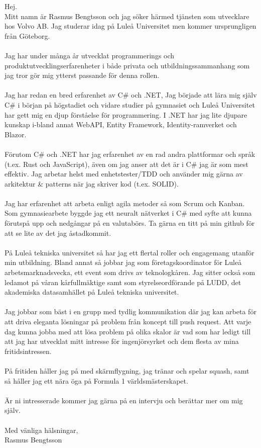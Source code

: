 \documentclass[a4paper]{article}
\newcommand{\company}{Volvo AB}
\newcommand{\position}{utvecklare }
\begin{document}
\vspace{10px}{}
\noindent\large{
Hej. \\

\noindent
Mitt namn är Rasmus Bengtsson och jag söker härmed tjänsten som \position hos \company. Jag studerar idag på Luleå Universitet men kommer ursprungligen från Göteborg. \\
\\
Jag har under många år utvecklat programmerings och produktutvecklingserfarenheter i både privata och utbildningssammanhang som jag tror gör mig ytterst passande för denna rollen. \\
\\
Jag har redan en bred erfarenhet av C\# och .NET, Jag började att lära mig själv C\# i början på högstadiet och vidare studier på gymnasiet och Luleå Universitet har gett mig en djup förståelse för programmering. I .NET har jag lite djupare kunskap i-bland annat WebAPI, Entity Framework, Identity-ramverket och Blazor. \\
\\
Förutom C\# och .NET har jag erfarenhet av en rad andra plattformar och språk (t.ex. Rust och JavaScript), även om jag anser att det är i C\# jag är som mest effektiv. Jag arbetar helst med enhetstester/TDD och använder mig gärna av arkitektur \& patterns när jag skriver kod (t.ex. SOLID). \\
\\
Jag har erfarenhet att arbeta enligt agila metoder så som Scrum och Kanban. Som gymnasiearbete byggde jag ett neuralt nätverket i C\# med syfte att kunna förutspå upp och nedgångar på en valutabörs. Ta gärna en titt på min github för att se lite av det jag åstadkommit. \\
\\
På Luleå tekniska universitet så har jag ett flertal roller och engagemang utanför min utbildning. Bland annat så jobbar jag som företagskoordinator för Luleå arbetsmarknadsvecka, ett event som drivs av teknologkåren. Jag sitter också som ledamot på våran kårfullmäktige samt som styrelseordförande på LUDD, det akademiska datasamhället på Luleå tekniska universitet. \\
\\
Jag jobbar som bäst i en grupp med tydlig kommunikation där jag kan arbeta för att driva eleganta lösningar på problem från koncept till push request. Att varje dag kunna jobba med att lösa problem på olika skalor är vad som har ledigt till att jag har utvecklat mitt intresse för ingenjörsyrket och dem flesta av mina fritidsintressen.\\
\\
På fritiden håller jag på med skärmflygning, jag tränar och spelar squash, samt så håller jag ett nära öga på Formula 1 världsmästerskapet.\\
\\              
Är ni intresserade kommer jag gärna på en intervju och berättar mer om mig själv.
\\ 
\\
Med vänliga hälsningar, \\
Rasmus Bengtsson
}
\end{document}
